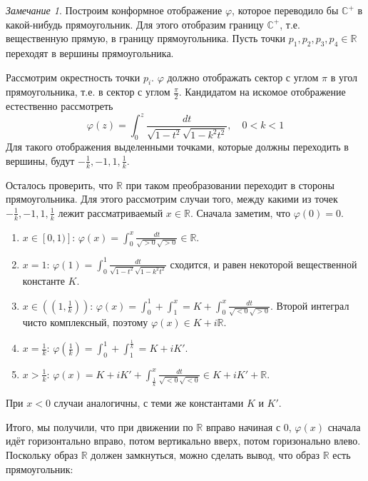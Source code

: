 \documentclass[12pt]{article}
\newcommand{\R}{\mathbb{R}}
\renewcommand{\C}{\mathbb{C}}
\theoremstyle{thmnote}
\theoremstyle{remark}
\newtheorem*{remark}{Замечание}
\theoremstyle{defnote}
\begin{document}
\begin{remark}
    Построим конформное отображение $\varphi$, которое переводило бы $\C^+$ в какой-нибудь прямоугольник. Для этого отобразим границу $\C^+$, т.е. вещественную прямую, в границу прямоугольника. Пусть точки $p_1, p_2, p_3, p_4 \in \R$ переходят в вершины прямоугольника.
    \begin{center}
    \begin{tikzpicture}
        
    \end{tikzpicture}
    \end{center}
    
    Рассмотрим окрестность точки $p_i$. $\varphi$ должно отображать сектор с углом $\pi$ в угол прямоугольника, т.е. в сектор с углом $\frac{\pi}{2}$. Кандидатом на искомое отображение естественно рассмотреть
    \begin{equation*}
        \varphi(z) = \int_0^z \frac{dt}{\sqrt{1 - t^2} \sqrt{1 - k^2 t^2}}, \quad 0 < k < 1
    \end{equation*}
    Для такого отображения выделенными точками, которые должны переходить в вершины, будут $-\frac{1}{k}, -1, 1, \frac{1}{k}$.

    Осталось проверить, что $\R$ при таком преобразовании переходит в стороны прямоугольника. Для этого рассмотрим случаи того, между какими из точек $-\frac{1}{k}, -1, 1, \frac{1}{k}$ лежит рассматриваемый $x \in \R$. Сначала заметим, что $\varphi(0) = 0$.
    \begin{enumerate}
        \item $x \in [0, 1)]$: $\varphi(x) = \int_0^x \frac{dt}{\sqrt{>0} \sqrt{>0}} \in \R$.
        \item $x = 1$: $\varphi(1) = \int_0^1 \frac{dt}{\sqrt{1 - t^2} \sqrt{1 - k^2 t^2}}$ сходится, и равен некоторой вещественной константе $K$.
        \item $x \in \left((1, \frac{1}{k})\right)$: $\varphi(x) = \int_0^1 + \int_1^x = K + \int_0^x \frac{dt}{\sqrt{<0} \sqrt{>0}}$. Второй интеграл чисто комплексный, поэтому $\varphi(x) \in K + i\R$.
        \item $x = \frac{1}{k}$: $\varphi\left(\frac{1}{k}\right) = \int_0^1 + \int_1^{\frac{1}{k}} = K + iK'$.
        \item $x > \frac{1}{k}$: $\varphi(x) = K + iK' + \int_{\frac{1}{k}}^x \frac{dt}{\sqrt{<0} \sqrt{<0}} \in K + iK' + \R$.
    \end{enumerate}
    При $x < 0$ случаи аналогичны, с теми же константами $K$ и $K'$.

    Итого, мы получили, что при движении по $\R$ вправо начиная с 0, $\varphi(x)$ сначала идёт горизонтально вправо, потом вертикально вверх, потом горизонально влево. Поскольку образ $\R$ должен замкнуться, можно сделать вывод, что образ $\R$ есть прямоугольник:
    \begin{center}
    \begin{tikzpicture}
        
    \end{tikzpicture}
    \end{center}
\end{remark}
\end{document}
